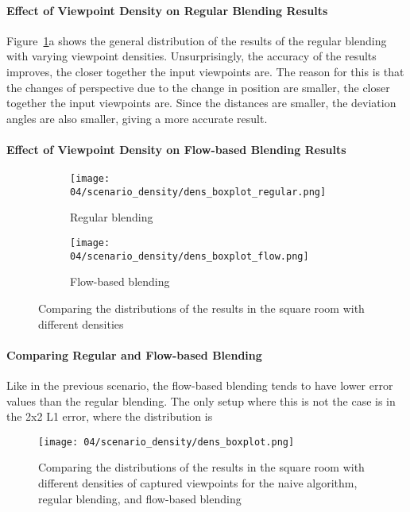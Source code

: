 \paragraph{Effect of Viewpoint Density on Regular Blending Results}
Figure~\ref{fig:density_boxplot_split}a shows the general distribution of the results of the regular blending with varying viewpoint densities. Unsurprisingly, the accuracy of the results improves, the closer together the input viewpoints are. The reason for this is that the changes of perspective due to the change in position are smaller, the closer together the input viewpoints are. Since the distances are smaller, the deviation angles are also smaller, giving a more accurate result. 

\paragraph{Effect of Viewpoint Density on Flow-based Blending Results}
\begin{figure}
\centering
    \hfill
    \begin{subfigure}[b]{0.5\textwidth}
            \centering
            \texttt{[image: 04/scenario\_density/dens\_boxplot\_regular.png]}
            \caption{Regular blending}
    \end{subfigure}%
    \hfill
    \begin{subfigure}[b]{0.5\textwidth}
            \centering
            \texttt{[image: 04/scenario\_density/dens\_boxplot\_flow.png]}
            \caption{Flow-based blending}
    \end{subfigure}
    \hfill
  \caption{Comparing the distributions of the results in the square room with different densities}
  \label{fig:density_boxplot_split}
\end{figure}

\paragraph{Comparing Regular and Flow-based Blending}
Like in the previous scenario, the flow-based blending tends to have lower error values than the regular blending. The only setup where this is not the case is in the 2x2 L1 error, where the distribution is 

\begin{figure}
		\centering
		\texttt{[image: 04/scenario\_density/dens\_boxplot.png]}
		\caption[Comparing the distributions of the results in the square room with different densities of captured viewpoints]{Comparing the distributions of the results in the square room with different densities of captured viewpoints for the naive algorithm, regular blending, and flow-based blending}
		\label{fig:scenario_dens_boxplot}
\end{figure}

